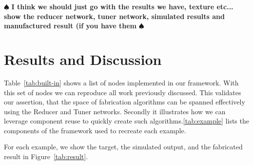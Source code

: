 \documentclass[annual]{acmsiggraph}
\newcommand{\note}[1]{\marginpar{\LARGE $\spadesuit$}
			$\spadesuit$ {\bf #1} $\spadesuit$}
\begin{document}
%
%
%
%
%
%

\note{I think we should just go with the results we have, texture etc... show the reducer network, tuner network, simulated results and manufactured result (if you have them}
\section{Results and Discussion}
Table~\ref{tab:built-in} shows a list of nodes implemented in our framework. With this set of nodes we can reproduce all work previously discussed. This validates our assertion, that the space of fabrication  algorithms can be spanned effectively using the Reducer and Tuner networks. Secondly it illustrates how we can leverage component reuse to quickly create such algorithms.\autoref{tab:example} lists the components of the framework used to recreate each example.

For each example, we show the target, the simulated output, and the fabricated result in Figure~\ref{tab:result}.
\end{document}
